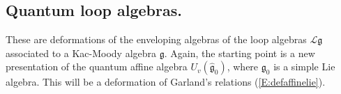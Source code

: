 \documentclass[a4paper,10pt]{amsart}
\def\g{\mathfrak{g}}
\numberwithin{equation}{section}
\begin{document}
{\vspace{.2in}

\subsection{Quantum loop algebras.}

\vspace{.15in}

These are deformations of the enveloping algebras of the loop algebras $\mathcal{L}\g$ associated to a Kac-Moody algebra $\g$. Again, the starting point is a new presentation of the quantum affine algebra $U_v(\widehat{\g}_0)$, where $\g_0$ is a simple Lie algebra. This will be a deformation of Garland's relations (\ref{E:defaffinelie}).

\vspace{.1in}

}
\end{document}
